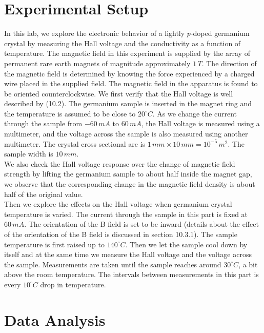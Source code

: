 \documentclass[11pt]{book}
\theoremstyle{break}
\theoremstyle{break}
\begin{document}
\section{Experimental Setup}
In this lab, we explore the electronic behavior of a lightly $p$-doped germanium crystal by measuring the Hall voltage and the conductivity as a function of temperature. The magnetic field in this experiment is supplied by the array of permanent rare earth magnets of magnitude approximately $1\, T$. The direction of the magnetic field is determined by knowing the force experienced by a charged wire placed in the supplied field. The magnetic field in the apparatus is found to be oriented counterclockwise. We first verify that the Hall voltage is well described by (10.2). The germanium sample is inserted in the magnet ring and the temperature is assumed to be close to $20^\circ C$. As we change the current through the sample from $-60\, mA$ to $60\, mA$, the Hall voltage is measured using a multimeter, and the voltage across the sample is also measured using another multimeter. The crystal cross sectional are is $1\, mm \times 10\, mm = 10^{-5}\, m^2$. The sample width is $10\, mm$. \\

We also check the Hall voltage response over the change of magnetic field strength by lifting the germanium sample to about half inside the magnet gap, we observe that the corresponding change in the magnetic field density is about half of the original value.\\

Then we explore the effects on the Hall voltage when germanium crystal temperature is varied. The current through the sample in this part is fixed at $60\, mA$. The orientation of the B field is set to be inward (details about the effect of the orientation of the B field is discussed in section 10.3.1). The sample temperature is first raised up to $140^\circ C$. Then we let the sample cool down by itself and at the same time we measure the Hall voltage and the voltage across the sample. Measurements are taken until the sample reaches around $30^\circ C$, a bit above the room temperature. The intervals between measurements in this part is every $10^\circ C$ drop in temperature.\\

\section{Data Analysis}
\end{document}
